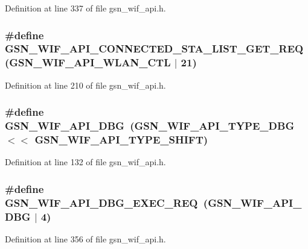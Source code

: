 Definition at line 337 of file gsn\_\-wif\_\-api.h.

\hypertarget{a00606_ad0d1457143b1e60fce103be6d8e28c23}{
\subsubsection[{GSN\_\-WIF\_\-API\_\-CONNECTED\_\-STA\_\-LIST\_\-GET\_\-REQ}]{\setlength{\rightskip}{0pt plus 5cm}\#define GSN\_\-WIF\_\-API\_\-CONNECTED\_\-STA\_\-LIST\_\-GET\_\-REQ~(GSN\_\-WIF\_\-API\_\-WLAN\_\-CTL $|$ 21)}}
\label{a00606_ad0d1457143b1e60fce103be6d8e28c23}


Definition at line 210 of file gsn\_\-wif\_\-api.h.

\hypertarget{a00606_afbcdd61ea6cafbc156859b2daeda0bc4}{
\subsubsection[{GSN\_\-WIF\_\-API\_\-DBG}]{\setlength{\rightskip}{0pt plus 5cm}\#define GSN\_\-WIF\_\-API\_\-DBG~(GSN\_\-WIF\_\-API\_\-TYPE\_\-DBG $<$$<$ GSN\_\-WIF\_\-API\_\-TYPE\_\-SHIFT)}}
\label{a00606_afbcdd61ea6cafbc156859b2daeda0bc4}


Definition at line 132 of file gsn\_\-wif\_\-api.h.

\hypertarget{a00606_a01c1d35b5f839c25f87a9e93b948cd11}{
\subsubsection[{GSN\_\-WIF\_\-API\_\-DBG\_\-EXEC\_\-REQ}]{\setlength{\rightskip}{0pt plus 5cm}\#define GSN\_\-WIF\_\-API\_\-DBG\_\-EXEC\_\-REQ~(GSN\_\-WIF\_\-API\_\-DBG $|$ 4)}}
\label{a00606_a01c1d35b5f839c25f87a9e93b948cd11}


Definition at line 356 of file gsn\_\-wif\_\-api.h.

